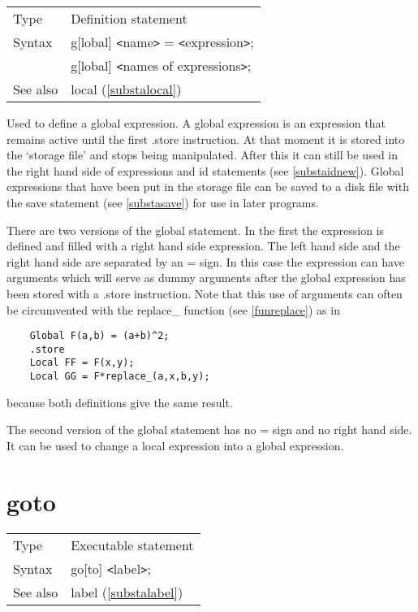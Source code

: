 \noindent \begin{tabular}{ll}
Type & Definition statement\\
Syntax & g[lobal] {\tt<}name{\tt>} = {\tt<}expression{\tt>}; \\
       & g[lobal] {\tt<}names of expressions{\tt>};
\\ See also & local (\ref{substalocal})
\end{tabular} \vspace{4mm}

\noindent Used to define a global 
expression. A global expression is an expression that 
remains active until the first .store instruction. At that 
moment it is stored into the `storage file' and stops being manipulated. After this it can 
still be used in the right hand side of expressions and id 
statements (see \ref{substaidnew}). Global expressions that have been put 
in the storage file can be saved to a disk file with the 
save statement (see \ref{substasave}) for use in later programs.

\noindent There are two versions of the global statement. In the first the 
expression is defined and filled with a right hand side expression. The left 
hand side and the right hand side are separated by an = sign. In this case 
the expression can have arguments which will serve as
dummy arguments after the global expression has been 
stored with a .store instruction. Note that this use of arguments can often 
be circumvented with the replace\_ function (see \ref{funreplace}) as in
\begin{verbatim}
    Global F(a,b) = (a+b)^2;
    .store
    Local FF = F(x,y);
    Local GG = F*replace_(a,x,b,y);
\end{verbatim}
because both definitions give the same result.

\noindent The second version of the global statement has no = sign and no 
right hand side. It can be used to change a local expression 
into a global expression. \vspace{10mm}


\section{goto}
\label{substagoto}

\noindent \begin{tabular}{ll}
Type & Executable statement\\
Syntax & go[to] {\tt<}label{\tt>}; \\
See also & label (\ref{substalabel})
\end{tabular} \vspace{4mm}

